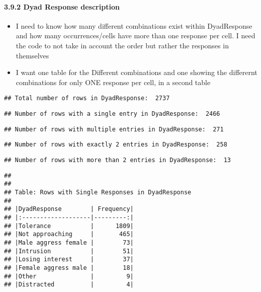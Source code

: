 \documentclass[
]{article}
\providecommand{\tightlist}{%
  \setlength{\itemsep}{0pt}\setlength{\parskip}{0pt}}
\begin{document}
\hypertarget{dyad-response-description}{%
\paragraph{3.9.2 Dyad Response
description}\label{dyad-response-description}}

\begin{itemize}
\tightlist
\item
  I need to know how many different combinations exist within
  DyadResponse and how many occurrences/cells have more than one
  response per cell. I need the code to not take in account the order
  but rather the responses in themselves
\item
  I want one table for the Different combinations and one showing the
  differernt combinations for only ONE response per cell, in a second
  table
\end{itemize}

\begin{verbatim}
## Total number of rows in DyadResponse:  2737
\end{verbatim}

\begin{verbatim}
## Number of rows with a single entry in DyadResponse:  2466
\end{verbatim}

\begin{verbatim}
## Number of rows with multiple entries in DyadResponse:  271
\end{verbatim}

\begin{verbatim}
## Number of rows with exactly 2 entries in DyadResponse:  258
\end{verbatim}

\begin{verbatim}
## Number of rows with more than 2 entries in DyadResponse:  13
\end{verbatim}

\begin{verbatim}
## 
## 
## Table: Rows with Single Responses in DyadResponse
## 
## |DyadResponse        | Frequency|
## |:-------------------|---------:|
## |Tolerance           |      1809|
## |Not approaching     |       465|
## |Male aggress female |        73|
## |Intrusion           |        51|
## |Losing interest     |        37|
## |Female aggress male |        18|
## |Other               |         9|
## |Distracted          |         4|
\end{verbatim}
\end{document}
